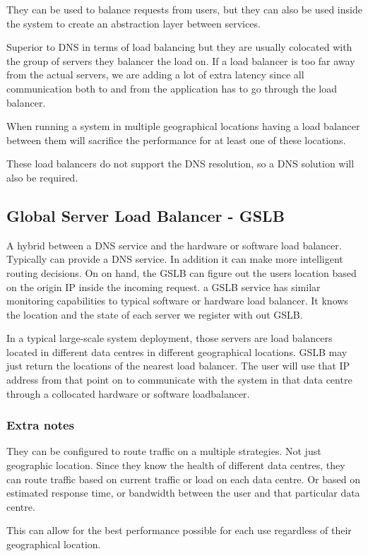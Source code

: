 They can be used to balance requests from users, but they can also be used inside the system to create an abstraction layer between services.

Superior to DNS in terms of load balancing but they are usually colocated with the group of servers they balancer the load on.
If a load balancer is too far away from the actual servers, we are adding a lot of extra latency since all communication both to and from the application has to go through the load balancer.

When running a system in multiple geographical locations having a load balancer between them will sacrifice the performance for at least one of these locations.

These load balancers do not support the DNS resolution, so a DNS solution will also be required.

\subsection{Global Server Load Balancer - GSLB}
A hybrid between a DNS service and the hardware or software load balancer.
Typically can provide a DNS service.
In addition it can make more intelligent routing decisions.
On on hand, the GSLB can figure out the users location based on the origin IP inside the incoming request.
a GSLB service has similar monitoring capabilities to typical software or hardware load balancer.
It knows the location and the state of each server we register with out GSLB.

In a typical large-scale system deployment, those servers are load balancers located in different data centres in different geographical locations.
GSLB may just return the locations of the nearest load balancer.
The user will use that IP address from that point on to communicate with the system in that data centre through a collocated hardware or software loadbalancer.

\subsubsection{Extra notes}
They can be configured to route traffic on a multiple strategies.
Not just geographic location.
Since they know the health of different data centres, they can route traffic based on current traffic or load on each data centre.
Or based on estimated response time, or bandwidth between the user and that particular data centre.

This can allow for the best performance possible for each use regardless of their geographical location.

